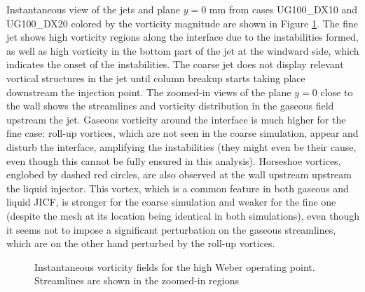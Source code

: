 Instantaneous view of the jets and plane $y = 0$ mm from cases UG100\_DX10 and UG100\_DX20 colored by the vorticity magnitude are shown in Figure \ref{fig:JICF_instabilities_vorticity}. The fine jet shows high vorticity regions along the interface due to the instabilities formed, as well as high vorticity in the bottom part of the jet at the windward side, which indicates the onset of the instabilities. The coarse jet does not display relevant vortical structures in the jet until column breakup starts taking place downstream the injection point. The zoomed-in views of the plane $y = 0$ close to the wall shows the streamlines and vorticity distribution in the gaseous field upstream the jet. Gaseous vorticity around the interface is much higher for the fine case: roll-up vortices, which are not seen in the coarse simulation, appear and disturb the interface, amplifying the instabilities (they might even be their cause, even though this cannot be fully ensured in this analysis). Horseshoe vortices, englobed by dashed red circles, are also observed at the wall upstream upstream the liquid injector. This vortex, which is a common feature in both gaseous  and liquid  JICF, is stronger for the coarse simulation and weaker for the fine one (despite the mesh at its location being identical in both simulations), even though it seems not to impose a significant perturbation on the gaseous streamlines, which are on the other hand perturbed by the roll-up vortices.


\begin{figure}[ht]
\flushleft
{}
\caption[Instantaneous vorticity fields for the high Weber operating point.]{Instantaneous vorticity fields for the high Weber operating point. Streamlines are shown in the zoomed-in regions}
\label{fig:JICF_instabilities_vorticity}
\end{figure}

